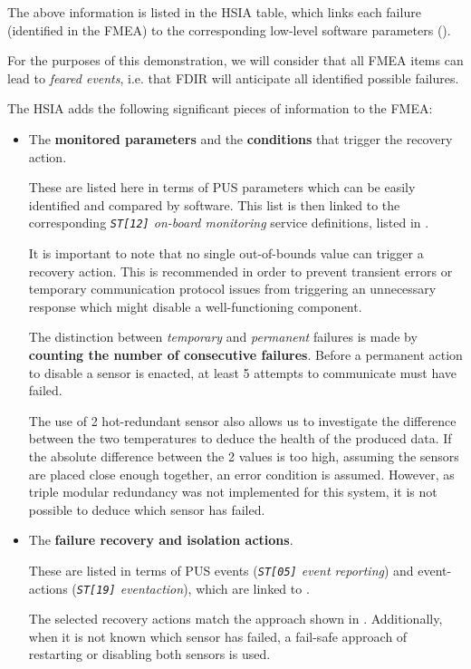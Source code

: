 \documentclass[a4paper,nobib]{tufte-book}
\begin{document}
The above information is listed in the \acf{HSIA} table, which links each failure (identified in the \acl{FMEA}) to the corresponding low-level software parameters ().

For the purposes of this demonstration, we will consider that all \ac{FMEA} items can lead to \emph{feared events}, i.e. that \ac{FDIR} will anticipate all identified possible failures.

The \ac{HSIA} adds the following significant pieces of information to the \ac{FMEA}:\autocite{ECSS-Q-ST-30-02C}
\begin{itemize}
	\item The \textbf{monitored parameters} and the \textbf{conditions} that trigger the recovery action.
	
	These are listed here in terms of \ac{PUS} parameters which can be easily identified and compared by software. This list is then linked to the corresponding \emph{\texttt{ST[12]} on-board monitoring} service definitions, listed in .
	
	It is important to note that no single out-of-bounds value can trigger a recovery action. This is recommended in order to prevent transient errors or temporary communication protocol issues from triggering an unnecessary response which might disable a well-functioning component.
	
	The distinction between \emph{temporary} and \emph{permanent} failures is made by \textbf{counting the number of consecutive failures}. Before a permanent action to disable a sensor is enacted, at least 5 attempts to communicate must have failed.
	
	The use of 2 hot-redundant sensor also allows us to investigate the difference between the two temperatures to deduce the health of the produced data. If the absolute difference between the 2 values is too high, assuming the sensors are placed close enough together, an error condition is assumed. However, as triple modular redundancy was not implemented for this system, it is not possible to deduce which sensor has failed.
	
	\item The \textbf{failure recovery and isolation actions}.
	
	These are listed in terms of \ac{PUS} events (\emph{\texttt{ST[05]} event reporting}) and event-actions (\emph{\texttt{ST[19]} eventaction}), which are linked to .
	
	The selected recovery actions match the approach shown in . Additionally, when it is not known which sensor has failed, a fail-safe approach of restarting or disabling both sensors is used.
\end{itemize}
\end{document}
